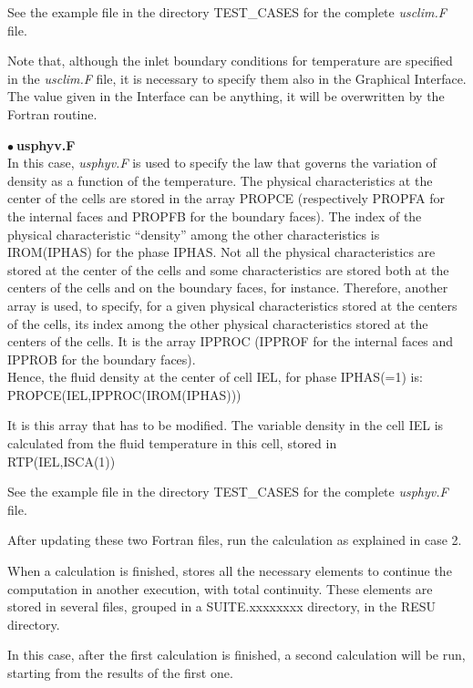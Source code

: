 See the example file in the directory TEST\_CASES for the complete
{\itshape usclim.F} file.

Note that, although the inlet boundary conditions for temperature are specified
in the {\itshape usclim.F} file, it is necessary to specify them also in the
Graphical Interface. The value given in the Interface can be anything, it will
be overwritten by the Fortran routine.


$\bullet\ $\textbf{usphyv.F}\\
In this case, {\itshape usphyv.F} is used to specify the law that governs the
variation of density as a function of the temperature. The physical
characteristics at the center of the cells are stored in the array PROPCE
(respectively PROPFA for the internal faces and PROPFB for the boundary faces).
The index of the physical characteristic ``density'' among the other
characteristics is IROM(IPHAS) for the phase IPHAS.
Not all the physical characteristics are stored at the center of the cells and
some characteristics are stored both at the centers of the cells and on the
boundary faces, for instance.
Therefore, another array is used, to specify, for a given physical
characteristics stored at the centers of the cells, its index among the other
physical characteristics stored at the centers of the cells. It is the array
IPPROC (IPPROF for the internal faces and IPPROB for the boundary faces).\\
Hence, the fluid density at the center of cell IEL, for phase IPHAS(=1) is:\\
PROPCE(IEL,IPPROC(IROM(IPHAS)))

It is this array that has to be modified. The variable density in the cell IEL
is calculated from the fluid temperature in this cell, stored in\\
RTP(IEL,ISCA(1))

See the example file in the directory TEST\_CASES for the complete
{\itshape usphyv.F} file.


After updating these two Fortran files, run the calculation as explained in case
2.


\newpage
When a calculation is finished, \CS stores all the necessary elements to
continue the computation in another execution, with total continuity. These
elements are stored in several files, grouped in a SUITE.xxxxxxxx directory, in
the RESU directory.

In this case, after the first calculation is finished, a second calculation will
be run, starting from the results of the first one.


